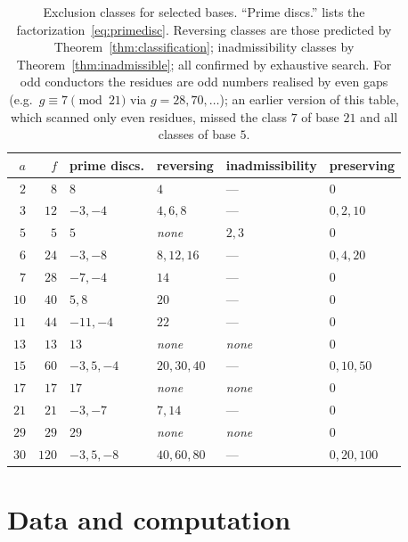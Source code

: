\documentclass[11pt,reqno]{amsart}
\theoremstyle{plain}
\theoremstyle{definition}
\begin{document}
\begin{table}[t]
\centering
\caption{Exclusion classes for selected bases. ``Prime discs.'' lists the
factorization~\eqref{eq:primedisc}. Reversing classes are those predicted by
Theorem~\ref{thm:classification}; inadmissibility classes by
Theorem~\ref{thm:inadmissible}; all confirmed by exhaustive search. For odd
conductors the residues are odd numbers realised by even gaps (e.g.\
$g \equiv 7 \pmod{21}$ via $g = 28, 70, \dots$); an earlier version of this
table, which scanned only even residues, missed the class $7$ of base $21$
and all classes of base $5$.}
\label{tab:classification}
\begin{tabular}{rrlll}
\toprule
$a$ & $f$ & prime discs. & reversing & inadmissibility & preserving \\
\midrule
$2$  & $8$   & $8$          & $4$          & ---      & $0$ \\
$3$  & $12$  & $-3, -4$     & $4, 6, 8$    & ---      & $0, 2, 10$ \\
$5$  & $5$   & $5$          & \emph{none}  & $2, 3$   & $0$ \\
$6$  & $24$  & $-3, -8$     & $8, 12, 16$  & ---      & $0, 4, 20$ \\
$7$  & $28$  & $-7, -4$     & $14$         & ---      & $0$ \\
$10$ & $40$  & $5, 8$       & $20$         & ---      & $0$ \\
$11$ & $44$  & $-11, -4$    & $22$         & ---      & $0$ \\
$13$ & $13$  & $13$         & \emph{none}  & \emph{none} & $0$ \\
$15$ & $60$  & $-3, 5, -4$  & $20, 30, 40$ & ---      & $0, 10, 50$ \\
$17$ & $17$  & $17$         & \emph{none}  & \emph{none} & $0$ \\
$21$ & $21$  & $-3, -7$     & $7, 14$      & ---      & $0$ \\
$29$ & $29$  & $29$         & \emph{none}  & \emph{none} & $0$ \\
$30$ & $120$ & $-3, 5, -8$  & $40, 60, 80$ & ---      & $0, 20, 100$ \\
\bottomrule
\end{tabular}
\end{table}

\section{Data and computation}
\label{sec:computation}
\end{document}
